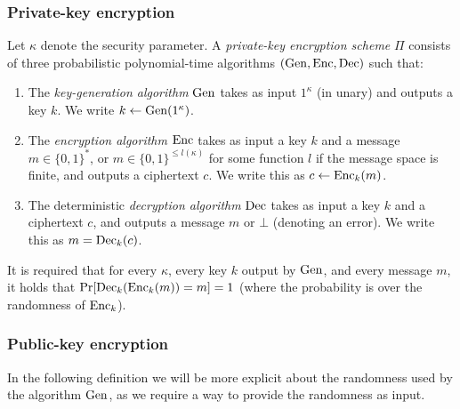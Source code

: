 \subsubsection{Private-key encryption}

\begin{definition}
	Let $\kappa$ denote the security parameter. A \emph{private-key encryption scheme} $\Pi$ consists of three probabilistic polynomial-time algorithms $(\mathrm{Gen}, \mathrm{Enc}, \mathrm{Dec})$ such that:
	\begin{enumerate}[1.]
		\item The \emph{key-generation algorithm} $\mathrm{Gen}$ takes as input $1^\kappa$ (in unary) and outputs a key $k$. We write $k \leftarrow \mathrm{Gen}(1^\kappa)$.
		\item The \emph{encryption algorithm} $\mathrm{Enc}$ takes as input a key $k$ and a message $m \in \{0, 1\}^*$, or $m \in \{0, 1\}^{\le l(\kappa)}$ for some function $l$ if the message space is finite, and outputs a ciphertext $c$. We write this as $c \leftarrow \mathrm{Enc}_k(m)$.
		\item The deterministic \emph{decryption algorithm} $\mathrm{Dec}$ takes as input a key $k$ and a ciphertext $c$, and outputs a message $m$ or $\bot$ (denoting an error). We write this as $m = \mathrm{Dec}_{k}(c)$.
	\end{enumerate}

	It is required that for every $\kappa$, every key $k$ output by $\mathrm{Gen}$, and every message $m$, it holds that $\pr{\dec_k(\enc_k(m)) = m} = 1$ (where the probability is over the randomness of $\mathrm{Enc}_k$).
\end{definition}

\subsubsection{Public-key encryption}

In the following definition we will be more explicit about the randomness used by the algorithm $\mathrm{Gen}$, as we require a way to provide the randomness as input.

